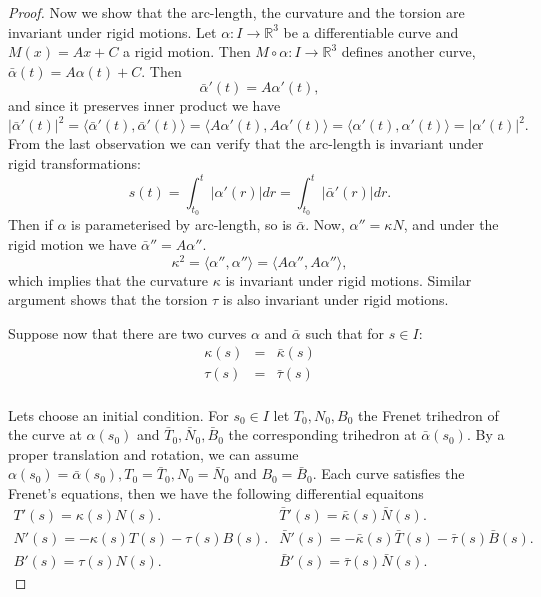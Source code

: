 \documentclass{amsart}
\begin{document}
\begin{proof}
Now we show that the arc-length, the curvature and the torsion are invariant under rigid motions.
Let \(\alpha:I\to\mathbb{R}^3\) be a differentiable curve and \(M(x) = Ax + C\) a rigid motion. Then \(M \circ \alpha : I \to \mathbb{R}^3\) defines another curve, \(\bar{\alpha} (t) = A\alpha(t) + C\). Then
\[ \bar{\alpha}'(t) = A\alpha'(t), \]
and since it preserves inner product we have
\[ |\bar{\alpha}'(t)|^2  = \langle \bar{\alpha}'(t), \bar{\alpha}'(t) \rangle = \langle A\alpha'(t), A\alpha'(t)\rangle = \langle \alpha'(t) , \alpha'(t) \rangle = |\alpha'(t)|^2. \]
From the last observation we can verify that the arc-length is invariant under rigid transformations:
\[ s(t) = \int_{t_0}^{t} |\alpha'(r)| dr = \int_{t_0}^{t} |\bar{\alpha}'(r)| dr. \]
Then if \(\alpha\) is parameterised by arc-length, so is \(\bar{\alpha}\). Now, \(\alpha'' = \kappa N\), and under the rigid motion we have \(\bar{\alpha}'' = A\alpha''\). 
\[ \kappa^2 = \langle \alpha'',\alpha''\rangle = \langle A\alpha'',A\alpha''\rangle, \]
which implies that the curvature \(\kappa\) is
invariant under rigid motions. Similar argument shows that the torsion \(\tau\) is also invariant under rigid motions.

Suppose now that there are two curves \(\alpha\) and \(\bar{\alpha}\) such that for \(s\in I\):
\begin{equation*}
\begin{split}
\kappa(s)& =& \bar{\kappa}(s)\\
\tau(s)& =& \bar{\tau}(s)\\
\end{split}
\end{equation*}

Lets choose an initial condition. For \(s_0\in I\) let \(T_0,N_0,B_0\) the Frenet trihedron of the curve at \(\alpha(s_0)\) and \(\bar{T}_0,\bar{N}_0,\bar{B}_0\) the corresponding trihedron at \(\bar{\alpha}(s_0)\). By a proper translation and rotation, we can assume
\(\alpha(s_0) = \bar{\alpha}(s_0), T_0 = \bar{T}_0, N_0 = \bar{N}_0\) and \(B_0 = \bar{B}_0\). Each curve satisfies the Frenet's equations, then we have the following differential equaitons
\begin{equation*}
\begin{array}{ll}
T'(s) = \kappa(s) N(s). & \bar{T}'(s) = \bar{\kappa}(s) \bar{N}(s).\\
N'(s) = -\kappa(s) T(s) - \tau(s) B(s). &  \bar{N}'(s) = -\bar{\kappa}(s) \bar{T}(s) - \bar{\tau}(s) \bar{B}(s).\\
B'(s) = \tau(s) N(s) . & \bar{B}'(s) = \bar{\tau}(s) \bar{N}(s) .
\end{array}
\end{equation*}


\end{proof}
\end{document}
